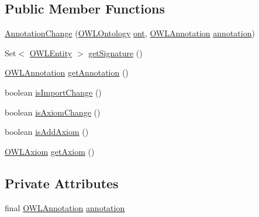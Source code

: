 \subsection*{Public Member Functions}
\begin{DoxyCompactItemize}
\item 
\hyperlink{classorg_1_1semanticweb_1_1owlapi_1_1model_1_1_annotation_change_aa36cf2810945a943b59b3b8afd0da1f7}{Annotation\-Change} (\hyperlink{interfaceorg_1_1semanticweb_1_1owlapi_1_1model_1_1_o_w_l_ontology}{O\-W\-L\-Ontology} \hyperlink{classorg_1_1semanticweb_1_1owlapi_1_1model_1_1_o_w_l_ontology_change_a9b8b64f1cab33aae500db20e19186211}{ont}, \hyperlink{interfaceorg_1_1semanticweb_1_1owlapi_1_1model_1_1_o_w_l_annotation}{O\-W\-L\-Annotation} \hyperlink{classorg_1_1semanticweb_1_1owlapi_1_1model_1_1_annotation_change_a82541adcd6969af37b2d2c2663e7f69c}{annotation})
\item 
Set$<$ \hyperlink{interfaceorg_1_1semanticweb_1_1owlapi_1_1model_1_1_o_w_l_entity}{O\-W\-L\-Entity} $>$ \hyperlink{classorg_1_1semanticweb_1_1owlapi_1_1model_1_1_annotation_change_ad06efdeacf46f788502894ad4c388b73}{get\-Signature} ()
\item 
\hyperlink{interfaceorg_1_1semanticweb_1_1owlapi_1_1model_1_1_o_w_l_annotation}{O\-W\-L\-Annotation} \hyperlink{classorg_1_1semanticweb_1_1owlapi_1_1model_1_1_annotation_change_a94a52bc879a3195a3826dbbaa96d9ff2}{get\-Annotation} ()
\item 
boolean \hyperlink{classorg_1_1semanticweb_1_1owlapi_1_1model_1_1_annotation_change_ab8cbf979d2485a65fe30e366e2c72bda}{is\-Import\-Change} ()
\item 
boolean \hyperlink{classorg_1_1semanticweb_1_1owlapi_1_1model_1_1_annotation_change_a22c768a2291bb068fa6f751447dccb50}{is\-Axiom\-Change} ()
\item 
boolean \hyperlink{classorg_1_1semanticweb_1_1owlapi_1_1model_1_1_annotation_change_ae78adfb7dd1512ba7eb8a9b1776247d1}{is\-Add\-Axiom} ()
\item 
\hyperlink{interfaceorg_1_1semanticweb_1_1owlapi_1_1model_1_1_o_w_l_axiom}{O\-W\-L\-Axiom} \hyperlink{classorg_1_1semanticweb_1_1owlapi_1_1model_1_1_annotation_change_a01e897507a9e2a229ee6ec784dedf5d7}{get\-Axiom} ()
\end{DoxyCompactItemize}
\subsection*{Private Attributes}
\begin{DoxyCompactItemize}
\item 
final \hyperlink{interfaceorg_1_1semanticweb_1_1owlapi_1_1model_1_1_o_w_l_annotation}{O\-W\-L\-Annotation} \hyperlink{classorg_1_1semanticweb_1_1owlapi_1_1model_1_1_annotation_change_a82541adcd6969af37b2d2c2663e7f69c}{annotation}
\end{DoxyCompactItemize}


